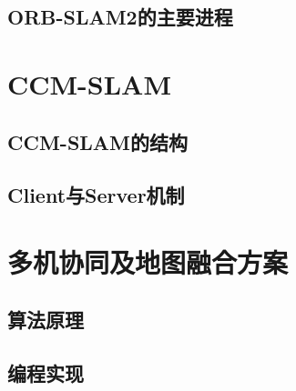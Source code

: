 \subsection{ORB-SLAM2的主要进程} \label{3.2.2}


\section{CCM-SLAM}

\subsection{CCM-SLAM的结构} \label{3.3.1}
\subsection{Client与Server机制} \label{3.3.2}


\section{多机协同及地图融合方案}

\subsection{算法原理} \label{3.4.1}
\subsection{编程实现} \label{3.4.2}